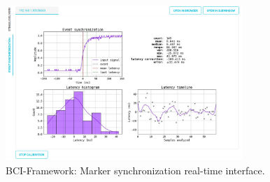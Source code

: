 \begin{figure}
\begin{centering}
% 
\includegraphics[width=0.8\textwidth]{Cap4/Figures/marker_sync.png}
\par\end{centering}
\caption[BCI-Framework: Marker synchronization]{BCI-Framework: Marker synchronization real-time interface.}
\label{fig:marker_sync}
\end{figure}